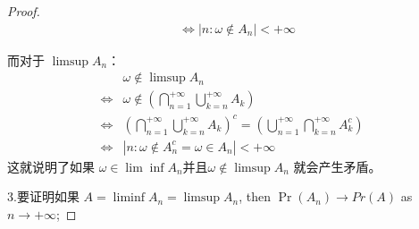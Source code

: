\documentclass[12pt, a4paper, oneside]{ctexart}
\begin{document}
\begin{proof}
$$\begin{aligned}
                                                                                                                                                                                                                                                                                                                                                                                                                                                                                                                                                                                                                                                                                                                                                                                                                                                                                                                                                                                                                                                                                                                                                                                                                                                                                                                                                                                                                                                                                                                                                                        & \Leftrightarrow  |{n: \omega\notin A_n}| < +\infty\end{aligned} $$

  而对于 $\limsup A_n$：
  $$ \begin{aligned} &\omega\notin \limsup A_n \\ \Leftrightarrow & \omega\notin (\bigcap_{n=1}^{+\infty}\bigcup_{k=n}^{+\infty}A_k) \\ \Leftrightarrow & (\bigcap_{n=1}^{+\infty}\bigcup_{k=n}^{+\infty}A_k)^c = (\bigcup_{n=1}^{+\infty}\bigcap_{k=n}^{+\infty}A_k^c) \\ \Leftrightarrow & |{n: \omega\notin A_n^c = \omega \in A_n}| < +\infty \end{aligned} $$ 这就说明了如果 $\omega \in \lim \inf A_n $并且$\omega \notin \limsup A_n$ 就会产生矛盾。


  3.要证明如果 $A=\liminf A_n=\limsup A_n$, then $\operatorname{Pr}\left(A_n\right) \rightarrow Pr(A)$ as $n \rightarrow +\infty$;


\end{proof}
\end{document}
